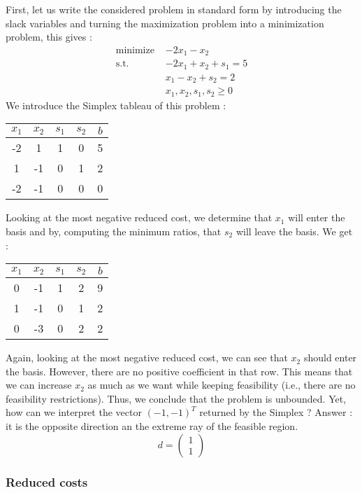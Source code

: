 First, let us write the considered problem in standard form by introducing the slack variables and turning the maximization problem into a minimization problem, this gives :
\begin{align*}
    \textrm{minimize } & -2x_1 - x_2\\
    \textrm{s.t. } & -2x_1 + x_2 + s_1 = 5\\
    & x_1 - x_2 + s_2 = 2\\
    & x_1, x_2, s_1, s_2\ge 0
\end{align*}
We introduce the Simplex tableau of this problem : 
\begin{center}
    \begin{tabular}{cccc|c}
        $x_1$ & $x_2$ & $s_1$ & $s_2$ & $b$ \\\hline
        -2 & 1 & 1 & 0 & 5\\
        1 & -1 & 0 & 1 & 2\\\hline
        -2 & -1 & 0 & 0 & 0
    \end{tabular}
\end{center} Looking at the most negative reduced cost, we determine that $x_1$ will enter the basis and by, computing the minimum ratios, that $s_2$ will leave the basis. We get : \begin{center}
    \begin{tabular}{cccc|c}
        $x_1$ & $x_2$ & $s_1$ & $s_2$ & $b$ \\\hline
        0 & -1 & 1 & 2 & 9\\
        1 & -1 & 0 & 1 & 2\\\hline
        0 & -3 & 0 & 2 & 2
    \end{tabular}
\end{center} Again, looking at the most negative reduced cost, we can see that $x_2$ should enter the basis. However, there are no positive coefficient in that row. This means that we can increase $x_2$ as much as we want while keeping feasibility (i.e., there are no feasibility restrictions). Thus, we conclude that the problem is unbounded. Yet, how can we interpret the vector $(-1, -1)^T$ returned by the Simplex ? Answer : it is the opposite direction an the extreme ray of the feasible region. 
\[ d = \begin{pmatrix} 1\\ 1 \end{pmatrix} \]

\subsubsection{Reduced costs}
